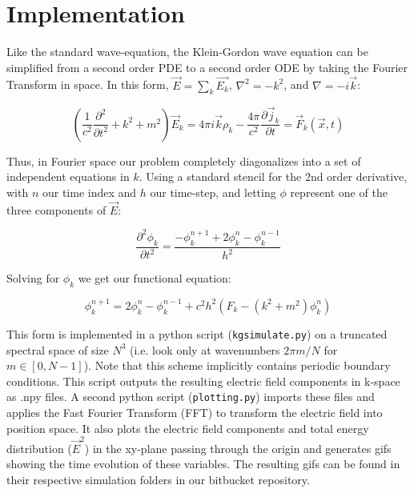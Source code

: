 \documentclass{article}
\begin{document}
	\section{Implementation}
	
	Like the standard wave-equation, the Klein-Gordon wave equation can be simplified from a second order PDE to a second order ODE by taking the Fourier Transform in space. In this form, $\vec{E} = \sum_{k}\vec{E_k}$, $\nabla^2 = -k^2$, and $\nabla = -i\vec{k}$:
	
	\begin{equation}
		\left(\frac{1}{c^2}\frac{\partial^2}{\partial t^2} + k^2 + m^2\right)\vec{E}_k = 4\pi i \vec{k} \rho_k - \frac{4\pi}{c^2}\frac{\partial\vec{j}_k}{\partial t} = \vec{F}_k(\vec{x},t)
	\end{equation}
	
	Thus, in Fourier space our problem completely diagonalizes into a set of independent equations in $k$.
	Using a standard stencil for the 2nd order derivative, with $n$ our time index and $h$ our time-step, and letting $\phi$ represent one of the three components of $\vec{E}$:
	
	\begin{equation}
		\frac{\partial^2 \phi_k}{\partial t^2} = \frac{-\phi_k^{n+1} + 2\phi_k^{n} - \phi_k^{n-1}}{h^2}
	\end{equation}
	
	Solving for $\phi_k$ we get our functional equation:
	
	\begin{equation}\boxed{
		\phi_k^{n+1} = 2\phi_k^n - \phi_k^{n-1} + c^2h^2(F_k - (k^2+m^2)\phi_k^n)}
	\label{eqn:functional}
	\end{equation}
	
	This form is implemented in a python script (\texttt{kgsimulate.py}) on a truncated spectral space of size $N^3$ (i.e. look only at wavenumbers $2\pi m/N$ for $m \in [0,N-1]$). Note that this scheme implicitly contains periodic boundary conditions. This script outputs the resulting electric field components in k-space as .npy files. A second python script (\texttt{plotting.py}) imports these files and applies the Fast Fourier Transform (FFT) to transform the electric field into position space. It also plots the electric field components and total energy distribution ($\vec{E}^2$) in the xy-plane passing through the origin and generates gifs showing the time evolution of these variables. The resulting gifs can be found in their respective simulation folders in our bitbucket repository.
	
\end{document}
